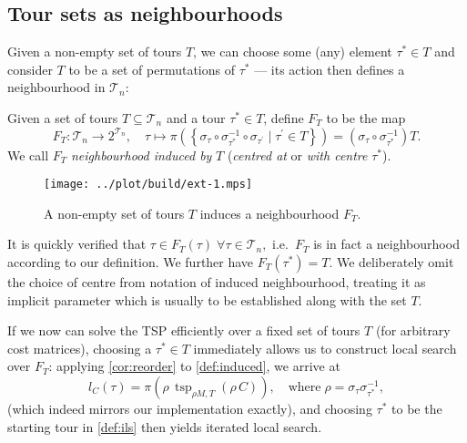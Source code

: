 \documentclass[index=totoc,bibliography=totoc]{scrartcl}
\numberwithin{equation}{section}
\numberwithin{figure}{section}
\numberwithin{table}{section}
\let\defstyle\itshape
\begin{document}
\subsection{Tour sets as neighbourhoods}

Given a non-empty set of tours $T$, we can choose some (any) element
$\tau^\ast \in T$ and consider $T$ to be a set of permutations of
$\tau^\ast$ --- its action then defines a neighbourhood in $\mathcal{T}_n$:

\begin{define}
  \label{def:induced}
  Given a set of tours $T \subseteq \mathcal{T}_n$ and a tour $\tau^\ast \in T$,
  define $F_T$ to be the map
  \[
    F_T: \mathcal{T}_n \to 2^{\mathcal{T}_n}, \quad
    \tau \mapsto
    \pi \left(
      \left\{ \sigma_{\tau} \circ \sigma_{\tau^\ast}^{-1} \circ \sigma_{\tau^\prime}
              \mid \tau^{\prime} \in T\right\}
    \right)
    =
      \left(\sigma_{\tau} \circ \sigma_{\tau^\ast}^{-1}\right) T.
  \]
  We call $F_T$ {\defstyle neighbourhood induced by} $T$
  ({\defstyle centred at} or {\defstyle with centre} $\tau^\ast$).
\end{define}

\begin{figure}[bht]
  \centering
  \texttt{[image: ../plot/build/ext-1.mps]}
  \caption{A non-empty set of tours $T$ induces a neighbourhood $F_T$.}
\end{figure}

\begin{remark}
  It is quickly verified that
  $\tau \in F_T\left(\tau\right) \; \forall \tau \in \mathcal{T}_n,$
  i.e.\ $F_T$ is in fact a neighbourhood according to our definition.
  We further have $F_T\left(\tau^\ast\right) = T$.
  We deliberately omit the choice of centre from notation of induced
  neighbourhood, treating it as implicit parameter which is usually
  to be established along with the set $T$.
\end{remark}

If we now can solve the TSP efficiently over a fixed set of tours $T$
(for arbitrary cost matrices), choosing a $\tau^\ast \in T$ immediately
allows us to construct local search over $F_T$:
applying \cref{cor:reorder} to \cref{def:induced}, we arrive at
\[
  l_C\left(\tau\right) =
  \pi\left(\rho\,\operatorname{tsp}_{\rho M,T}\left(\rho\, C\right)\right),
  \quad
  \text{where}\; \rho = \sigma_\tau \sigma_{\tau^\ast}^{-1},
\]
(which indeed mirrors our implementation exactly),
and choosing $\tau^\ast$ to be the starting tour in \cref{def:ils} then
yields iterated local search.
%
%
%
\end{document}
